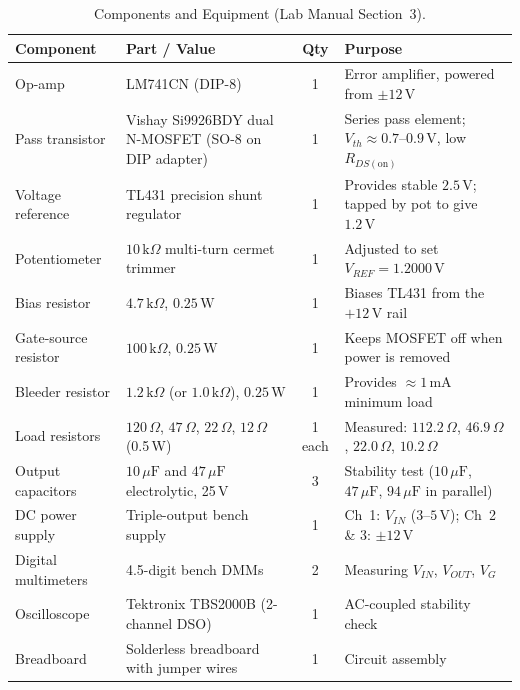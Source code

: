 \documentclass[11pt,a4paper]{article}
\begin{document}
\begin{table}[htbp]
\centering
\caption{Components and Equipment (Lab Manual Section~3).}
\label{tab:components}
\small
\begin{tabularx}{\textwidth}{l l c X}
\toprule
\textbf{Component} & \textbf{Part / Value} & \textbf{Qty} & \textbf{Purpose} \\
\midrule
Op-amp & LM741CN (DIP-8) & 1 & Error amplifier, powered from $\pm 12\,\text{V}$ \\
Pass transistor & Vishay Si9926BDY dual N-MOSFET (SO-8 on DIP adapter) & 1 & Series pass element; $V_{th} \approx 0.7\text{--}0.9\,\text{V}$, low $R_{DS(\text{on})}$ \\
Voltage reference & TL431 precision shunt regulator & 1 & Provides stable $2.5\,\text{V}$; tapped by pot to give $1.2\,\text{V}$ \\
Potentiometer & $10\,\text{k}\Omega$ multi-turn cermet trimmer & 1 & Adjusted to set $V_{REF} = 1.2000\,\text{V}$ \\
Bias resistor & $4.7\,\text{k}\Omega$, $0.25\,\text{W}$ & 1 & Biases TL431 from the $+12\,\text{V}$ rail \\
Gate-source resistor & $100\,\text{k}\Omega$, $0.25\,\text{W}$ & 1 & Keeps MOSFET off when power is removed \\
Bleeder resistor & $1.2\,\text{k}\Omega$ (or $1.0\,\text{k}\Omega$), $0.25\,\text{W}$ & 1 & Provides $\approx 1\,\text{mA}$ minimum load \\
Load resistors & $120\,\Omega$, $47\,\Omega$, $22\,\Omega$, $12\,\Omega$ (0.5\,W) & 1 each & Measured: $112.2\,\Omega$, $46.9\,\Omega$, $22.0\,\Omega$, $10.2\,\Omega$ \\
Output capacitors & $10\,\mu\text{F}$ and $47\,\mu\text{F}$ electrolytic, 25\,V & 3 & Stability test ($10\,\mu\text{F}$, $47\,\mu\text{F}$, $94\,\mu\text{F}$ in parallel) \\
DC power supply & Triple-output bench supply & 1 & Ch~1: $V_{IN}$ ($3\text{--}5\,\text{V}$); Ch~2 \& 3: $\pm 12\,\text{V}$ \\
Digital multimeters & 4.5-digit bench DMMs & 2 & Measuring $V_{IN}$, $V_{OUT}$, $V_G$ \\
Oscilloscope & Tektronix TBS2000B (2-channel DSO) & 1 & AC-coupled stability check \\
Breadboard & Solderless breadboard with jumper wires & 1 & Circuit assembly \\
\bottomrule
\end{tabularx}
\end{table}
\end{document}
